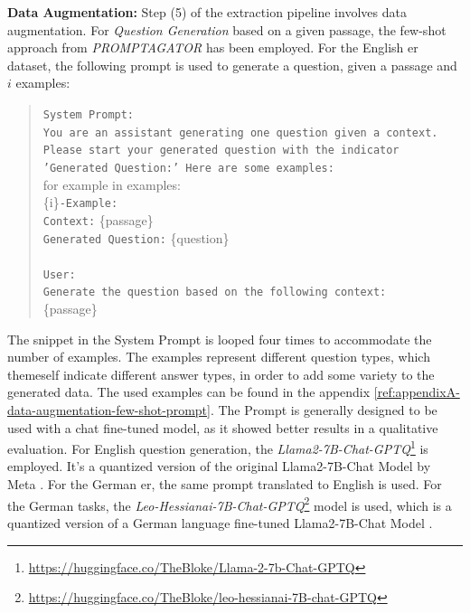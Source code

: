 \textbf{Data Augmentation:} Step (5) of the extraction pipeline involves data augmentation. For \textit{Question Generation} based on a given passage, the few-shot approach from \textit{PROMPTAGATOR} \cite{dai_promptagator_2022} has been employed. For the English \gls{er} dataset, the following prompt is used to generate a question, given a passage and $i$ examples:

\begin{quote}
   \texttt{System Prompt:}\\
    \texttt{You are an assistant generating one question given a context. Please start your generated question with the indicator 'Generated Question:' Here are some examples:} \\
    for example in examples:\\
    \hspace*{1cm}\{i\}\texttt{-Example:} \\
    \hspace*{1cm}\texttt{Context:} \{passage\} \\
    \hspace*{1cm}\texttt{Generated Question:} \{question\} \\ \\
    \texttt{User:} \\
    \texttt{Generate the question based on the following context:}\\
    \{passage\}
    \label{prompt:system-prompt-data-generation}
\end{quote}

The snippet in the System Prompt is looped four times to accommodate the number of examples. The examples represent different question types, which themeself indicate different answer types, in order to add some variety to the generated data. The used examples can be found in the appendix \ref{ref:appendixA-data-augmentation-few-shot-prompt}. The Prompt is generally designed to be used with a chat fine-tuned model, as it showed better results in a qualitative evaluation. For English question generation, the \textit{Llama2-7B-Chat-GPTQ}\footnote{\url{https://huggingface.co/TheBloke/Llama-2-7b-Chat-GPTQ}} is employed. It's a quantized version of the original Llama2-7B-Chat Model by Meta \cite{touvron_llama_2023}. For the German \gls{er}, the same prompt translated to English is used. For the German tasks, the \textit{Leo-Hessianai-7B-Chat-GPTQ}\footnote{\url{https://huggingface.co/TheBloke/leo-hessianai-7B-chat-GPTQ}} model is used, which is a quantized version of a German language fine-tuned Llama2-7B-Chat Model \cite{pluster_leolm_2023}.

